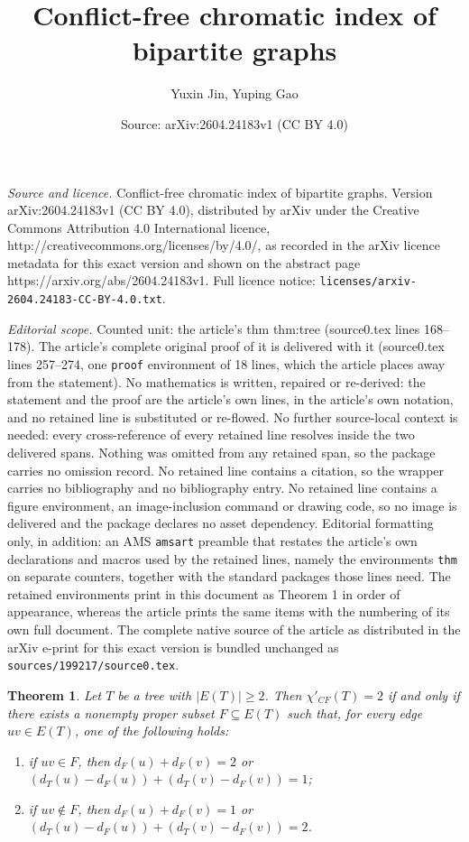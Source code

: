 \documentclass[10pt,a4paper]{amsart}
\title{Conflict-free chromatic index of bipartite graphs}
\author{Yuxin Jin, Yuping Gao}
\date{Source: arXiv:2604.24183v1 (CC BY 4.0)}
\newtheorem{thm}{Theorem}
\begin{document}
\maketitle

\noindent\emph{Source and licence.} Conflict-free chromatic index of bipartite graphs. Version arXiv:2604.24183v1 (CC BY 4.0), distributed by arXiv under the Creative Commons Attribution 4.0 International licence, http://creativecommons.org/licenses/by/4.0/, as recorded in the arXiv licence metadata for this exact version and shown on the abstract page https://arxiv.org/abs/2604.24183v1. Full licence notice: \texttt{licenses/arxiv-2604.24183-CC-BY-4.0.txt}.\par\smallskip

\noindent\textit{Editorial scope.} Counted unit: the article's thm thm:tree (source0.tex lines 168--178). The article's complete original proof of it is delivered with it (source0.tex lines 257--274, one \texttt{proof} environment of 18 lines, which the article places away from the statement). No mathematics is written, repaired or re-derived: the statement and the proof are the article's own lines, in the article's own notation, and no retained line is substituted or re-flowed.  No further source-local context is needed: every cross-reference of every retained line resolves inside the two delivered spans.  Nothing was omitted from any retained span, so the package carries no omission record.  No retained line contains a citation, so the wrapper carries no bibliography and no bibliography entry.  No retained line contains a figure environment, an image-inclusion command or drawing code, so no image is delivered and the package declares no asset dependency.  Editorial formatting only, in addition: an AMS \texttt{amsart} preamble that restates the article's own declarations and macros used by the retained lines, namely the environments \texttt{thm} on separate counters, together with the standard packages those lines need.  The retained environments print in this document as Theorem 1 in order of appearance, whereas the article prints the same items with the numbering of its own full document.  The complete native source of the article as distributed in the arXiv e-print for this exact version is bundled unchanged as \texttt{sources/199217/source0.tex}.
\begin{thm}\label{thm:tree}
Let $T$ be a tree with $|E(T)|\ge 2$. Then $\chi'_{CF}(T)=2$ if and only if
there exists a nonempty proper subset $F\subseteq E(T)$ such that, for every edge
$uv\in E(T)$, one of the following holds:
\begin{enumerate}[label={\rm(\roman*)}]
\item if $uv\in F$, then
$d_F(u)+d_F(v)=2$ or $(d_T(u)-d_F(u))+(d_T(v)-d_F(v))=1$; \label{condition:i}
\item if $uv\notin F$, then
$d_F(u)+d_F(v)=1$ or $(d_T(u)-d_F(u))+(d_T(v)-d_F(v))=2$.\label{condition:ii}
\end{enumerate}
\end{thm}
\end{document}
